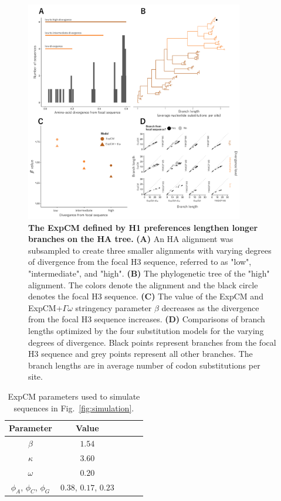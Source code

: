 \documentclass[11pt]{article}
\begin{document}
\begin{figure}[H]
\centerline{\includegraphics[width=0.85\textwidth]{figures/experiment_lee}}
\caption{\label{fig:experiment_lee}
\textbf{The ExpCM defined by H1 preferences lengthen longer branches on the HA tree.} 
\textbf{(A)} An HA alignment was subsampled to create three smaller alignments with varying degrees of divergence from the focal H3 sequence, referred to as "low", "intermediate", and "high". 
\textbf{(B)} The phylogenetic tree of the "high" alignment. 
The colors denote the alignment and the black circle denotes the focal H3 sequence. 
\textbf{(C)} The value of the ExpCM and ExpCM+$\Gamma\omega$ stringency parameter $\beta$ decreases as the divergence from the focal H3 sequence increases. 
\textbf{(D)} Comparisons of branch lengths optimized by the four substitution models for the varying degrees of divergence. 
Black points represent branches from the focal H3 sequence and grey points represent all other branches.  
The branch lengths are in average number of codon substitutions per site. 
}
\end{figure}

\begin{table}[t!]
\caption{\label{tab:simulation_params}
ExpCM parameters used to simulate sequences in Fig.~\ref{fig:simulation}.}
      \begin{tabular}{ccccc}
        \hline
          Parameter & Value\\ \hline
       	$\beta$ & $1.54$\\
	$\kappa$ & $3.60$\\
	$\omega$ & $0.20$\\
	$\phi_A$, $\phi_C$, $\phi_G$& $0.38$, $0.17$, $0.23$\\
      \end{tabular}
\end{table}
\end{document}
